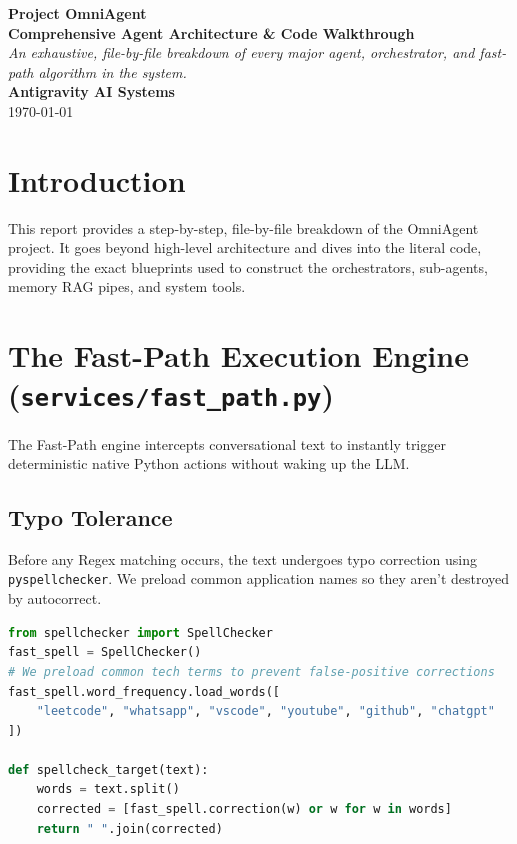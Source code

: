 \documentclass[11pt,a4paper]{report}
\begin{document}
\begin{titlepage}
    \centering
    \vspace*{3cm}
    \Huge \textbf{Project OmniAgent} \\
    \vspace{0.5cm}
    \Large \textbf{Comprehensive Agent Architecture & Code Walkthrough} \\
    \vspace{2cm}
    \large \textit{An exhaustive, file-by-file breakdown of every major agent, orchestrator, and fast-path algorithm in the system.} \\
    \vspace{3cm}
    \normalsize \textbf{Antigravity AI Systems} \\
    \today
\end{titlepage}

\tableofcontents
\newpage

\chapter{Introduction}
This report provides a step-by-step, file-by-file breakdown of the OmniAgent project. It goes beyond high-level architecture and dives into the literal code, providing the exact blueprints used to construct the orchestrators, sub-agents, memory RAG pipes, and system tools.

\chapter{The Fast-Path Execution Engine (\texttt{services/fast\_path.py})}
The Fast-Path engine intercepts conversational text to instantly trigger deterministic native Python actions without waking up the LLM. 

\section{Typo Tolerance}
Before any Regex matching occurs, the text undergoes typo correction using \texttt{pyspellchecker}. We preload common application names so they aren't destroyed by autocorrect.
\begin{lstlisting}[language=Python]
from spellchecker import SpellChecker
fast_spell = SpellChecker()
# We preload common tech terms to prevent false-positive corrections
fast_spell.word_frequency.load_words([
    "leetcode", "whatsapp", "vscode", "youtube", "github", "chatgpt"
])

def spellcheck_target(text):
    words = text.split()
    corrected = [fast_spell.correction(w) or w for w in words]
    return " ".join(corrected)
\end{lstlisting}
\end{document}
